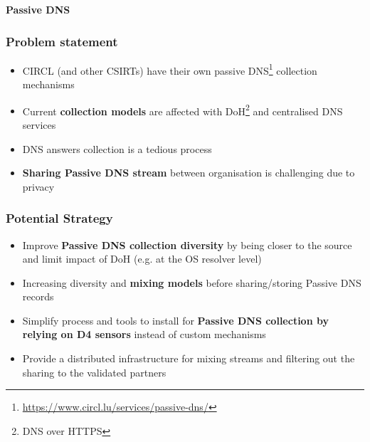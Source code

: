 \documentclass{beamer}
\begin{document}
      

\begin{frame}
  \begin{center}
    {\bf Passive DNS}
  \end{center}
\end{frame}

\begin{frame}
        \frametitle{Problem statement}
        \begin{itemize}
                \item CIRCL (and other CSIRTs) have their own passive DNS\footnote{\url{https://www.circl.lu/services/passive-dns/}} collection mechanisms
                \item Current {\bf collection models} are affected with DoH\footnote{DNS over HTTPS} and centralised DNS services
                \item DNS answers collection is a tedious process
                \item {\bf Sharing Passive DNS stream} between organisation is challenging due to privacy
        \end{itemize}
\end{frame}

\begin{frame}
        \frametitle{Potential Strategy}
 \begin{itemize}
         \item Improve {\bf Passive DNS collection diversity} by being closer to the source and limit impact of DoH (e.g. at the OS resolver level)
         \item Increasing diversity and {\bf mixing models} before sharing/storing Passive DNS records
         \item Simplify process and tools to install for {\bf Passive DNS collection by relying on D4 sensors} instead of custom mechanisms
         \item Provide a distributed infrastructure for mixing streams and filtering out the sharing to the validated partners
 \end{itemize}
\end{frame}
\end{document}
